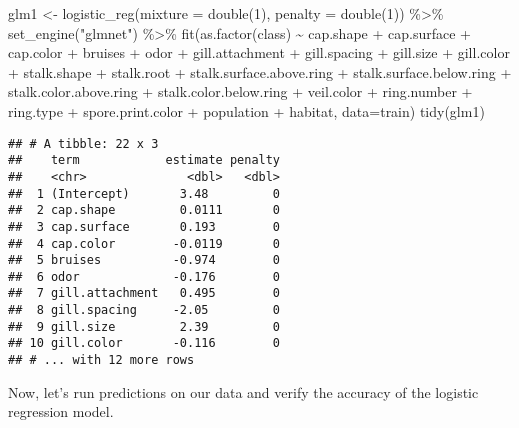 \documentclass[
]{article}
\newenvironment{Shaded}{\begin{snugshade}}{\end{snugshade}}
\newcommand{\AttributeTok}[1]{\textcolor[rgb]{0.77,0.63,0.00}{#1}}
\newcommand{\DecValTok}[1]{\textcolor[rgb]{0.00,0.00,0.81}{#1}}
\newcommand{\FunctionTok}[1]{\textcolor[rgb]{0.00,0.00,0.00}{#1}}
\newcommand{\NormalTok}[1]{#1}
\newcommand{\OtherTok}[1]{\textcolor[rgb]{0.56,0.35,0.01}{#1}}
\newcommand{\SpecialCharTok}[1]{\textcolor[rgb]{0.00,0.00,0.00}{#1}}
\newcommand{\StringTok}[1]{\textcolor[rgb]{0.31,0.60,0.02}{#1}}
\begin{document}
\begin{Shaded}
\begin{Highlighting}[]
\NormalTok{glm1 }\OtherTok{\textless{}{-}} \FunctionTok{logistic\_reg}\NormalTok{(}\AttributeTok{mixture =} \FunctionTok{double}\NormalTok{(}\DecValTok{1}\NormalTok{), }\AttributeTok{penalty =} \FunctionTok{double}\NormalTok{(}\DecValTok{1}\NormalTok{)) }\SpecialCharTok{\%\textgreater{}\%} \FunctionTok{set\_engine}\NormalTok{(}\StringTok{"glmnet"}\NormalTok{) }\SpecialCharTok{\%\textgreater{}\%} \FunctionTok{fit}\NormalTok{(}\FunctionTok{as.factor}\NormalTok{(class) }\SpecialCharTok{\textasciitilde{}}\NormalTok{ cap.shape }\SpecialCharTok{+}\NormalTok{ cap.surface }\SpecialCharTok{+}\NormalTok{ cap.color }\SpecialCharTok{+}\NormalTok{ bruises }\SpecialCharTok{+}\NormalTok{ odor }\SpecialCharTok{+}\NormalTok{ gill.attachment }\SpecialCharTok{+}\NormalTok{ gill.spacing }\SpecialCharTok{+}\NormalTok{ gill.size }\SpecialCharTok{+}\NormalTok{ gill.color }\SpecialCharTok{+}\NormalTok{ stalk.shape }\SpecialCharTok{+}\NormalTok{ stalk.root }\SpecialCharTok{+}\NormalTok{ stalk.surface.above.ring }\SpecialCharTok{+}\NormalTok{ stalk.surface.below.ring }\SpecialCharTok{+}\NormalTok{ stalk.color.above.ring }\SpecialCharTok{+}\NormalTok{ stalk.color.below.ring }\SpecialCharTok{+}\NormalTok{ veil.color }\SpecialCharTok{+}\NormalTok{ ring.number }\SpecialCharTok{+}\NormalTok{ ring.type }\SpecialCharTok{+}\NormalTok{ spore.print.color }\SpecialCharTok{+}\NormalTok{ population }\SpecialCharTok{+}\NormalTok{ habitat, }\AttributeTok{data=}\NormalTok{train)}
\FunctionTok{tidy}\NormalTok{(glm1)}
\end{Highlighting}
\end{Shaded}

\begin{verbatim}
## # A tibble: 22 x 3
##    term            estimate penalty
##    <chr>              <dbl>   <dbl>
##  1 (Intercept)       3.48         0
##  2 cap.shape         0.0111       0
##  3 cap.surface       0.193        0
##  4 cap.color        -0.0119       0
##  5 bruises          -0.974        0
##  6 odor             -0.176        0
##  7 gill.attachment   0.495        0
##  8 gill.spacing     -2.05         0
##  9 gill.size         2.39         0
## 10 gill.color       -0.116        0
## # ... with 12 more rows
\end{verbatim}

Now, let's run predictions on our data and verify the accuracy of the
logistic regression model.
\end{document}
